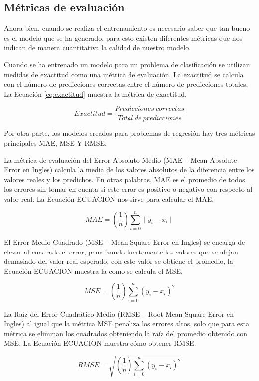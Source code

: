 \subsection{Métricas de evaluación}


Ahora bien, cuando se realiza el entrenamiento es necesario saber que tan bueno es el modelo que se ha generado, para esto existen diferentes métricas que nos indican de manera cuantitativa la calidad de nuestro modelo.

Cuando se ha entrenado un modelo para un problema de clasificación se utilizan medidas de exactitud como una métrica de evaluación. La exactitud se calcula con el número de predicciones correctas entre el número de predicciones totales, La Ecuación \ref{eq:exactitud} muestra la métrica de exactitud.

\begin{equation}
    \label{eq:exactitud}
    Exactitud = \frac{Predicciones \: correctas}{ Total \: de \: predicciones}
\end{equation}

Por otra parte, los modelos creados para problemas de regresión hay tres métricas principales MAE, MSE Y RMSE.

La métrica de evaluación del Error Absoluto Medio (MAE – Mean Absolute Error en Ingles) calcula la media de los valores absolutos de la diferencia entre los valores reales y los predichos. En otras palabras, MAE es el promedio de todos los errores sin tomar en cuenta si este error es positivo o negativo con respecto al valor real. La Ecuación ECUACION nos sirve para calcular el MAE.

\begin{equation}
    \label{eq:MAE}
    MAE = (\frac{1}{n}) \displaystyle\sum\limits_{i=0}^n \mid y_i - x_i \mid
\end{equation}

El Error Medio Cuadrado (MSE – Mean Square Error en Ingles) se encarga de elevar al cuadrado el error, penalizando fuertemente los valores que se alejan demasiado del valor real esperado, con este valor se obtiene el promedio, la Ecuación ECUACION muestra la como se calcula el MSE.

\begin{equation}
    \label{eq:MSE}
    MSE = (\frac{1}{n}) \displaystyle\sum\limits_{i=0}^n (y_i - x_i)^{2}
\end{equation}

La Raíz del Error Cuadrático Medio (RMSE – Root Mean Square Error en Ingles) al igual que la métrica MSE penaliza los errores altos, solo que para esta métrica se eliminan los cuadrados obteniendo la raíz del promedio obtenido con MSE. La Ecuación ECUACION muestra cómo obtener RMSE.

\begin{equation}
    \label{eq:RMSE}
    RMSE = \sqrt {
        (\frac{1}{n}) \displaystyle\sum\limits_{i=0}^n (y_i - x_i)^{2}
    }
\end{equation}

